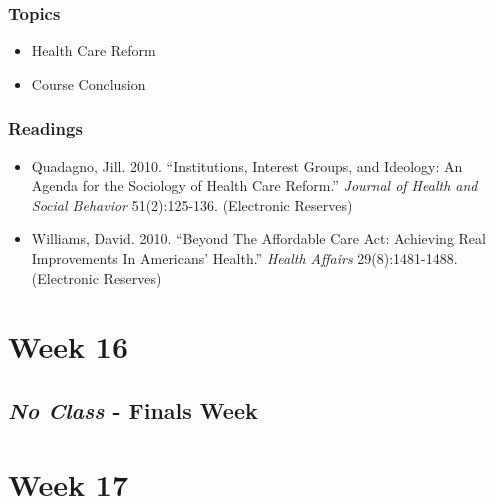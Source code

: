 \documentclass[]{book}
\providecommand{\tightlist}{%
  \setlength{\itemsep}{0pt}\setlength{\parskip}{0pt}}
\begin{document}
\hypertarget{topics-29}{%
\subsubsection*{Topics}\label{topics-29}}

\begin{itemize}
\tightlist
\item
  Health Care Reform
\item
  Course Conclusion
\end{itemize}

\hypertarget{readings-27}{%
\subsubsection*{Readings}\label{readings-27}}

\begin{itemize}
\tightlist
\item
  Quadagno, Jill. 2010. ``Institutions, Interest Groups, and Ideology: An Agenda for the Sociology of Health Care Reform.'' \emph{Journal of Health and Social Behavior} 51(2):125-136. (Electronic Reserves)
\item
  Williams, David. 2010. ``Beyond The Affordable Care Act: Achieving Real Improvements In Americans' Health.'' \emph{Health Affairs} 29(8):1481-1488. (Electronic Reserves)
\end{itemize}

\newpage

\hypertarget{week-16}{%
\section*{Week 16}\label{week-16}}

\hypertarget{no-class---finals-week}{%
\subsection*{\texorpdfstring{\emph{No Class} - Finals Week}{No Class - Finals Week}}\label{no-class---finals-week}}

\newpage

\hypertarget{week-17}{%
\section*{Week 17}\label{week-17}}
\end{document}
